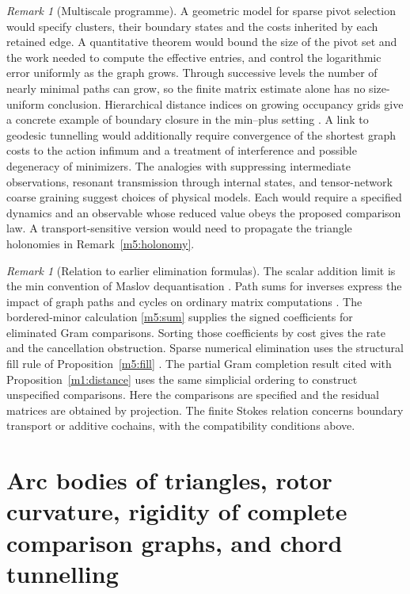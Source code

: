 \documentclass[11pt,reqno]{amsart}
\theoremstyle{definition}
\theoremstyle{remark}
\newtheorem{remark}[theorem]{Remark}
\numberwithin{equation}{section}
\begin{document}
\begin{remark}[Multiscale programme]\label{m5:programme}
A geometric model for sparse pivot selection would specify clusters, their
boundary states and the costs inherited by each retained edge. A
quantitative theorem would bound the size of the pivot set and the
work needed to compute the effective entries, and control the
logarithmic error uniformly as the graph grows. Through successive
levels the number of nearly minimal paths can grow, so the finite
matrix estimate alone has no size-uniform conclusion.
Hierarchical distance indices on growing occupancy grids give a
concrete example of boundary closure in the min--plus setting
\cite[\S V, Theorem~1]{m5:HTrip}. A link to
geodesic tunnelling would additionally require convergence of the
shortest graph costs to the action infimum and a treatment of
interference and possible degeneracy of minimizers. The analogies
with suppressing intermediate observations, resonant transmission
through internal states, and tensor-network coarse graining suggest
choices of physical models. Each would require a specified dynamics
and an observable whose reduced value obeys the proposed comparison
law. A transport-sensitive version would need to propagate the
triangle holonomies in Remark~\ref{m5:holonomy}.
\end{remark}

\begin{remark}[Relation to earlier elimination formulas]\label{m5:literature}
The scalar addition limit is the min convention of Maslov
dequantisation \cite[\S2]{m5:Litvinov}. Path sums for inverses
express the impact of graph paths and cycles on ordinary matrix
computations \cite[Thm.~3.2]{m5:Giscard}. The bordered-minor
calculation \eqref{m5:sum} supplies the signed coefficients for
eliminated Gram comparisons. Sorting those coefficients by cost
gives the rate and the cancellation obstruction. Sparse numerical
elimination uses the structural fill rule of
Proposition~\ref{m5:fill} \cite{m5:Rose}. The partial Gram completion
result cited with Proposition~\ref{m1:distance} uses the same
simplicial ordering to construct unspecified comparisons. Here
the comparisons are specified and the residual matrices are
obtained by projection. The finite Stokes relation concerns
boundary transport or additive cochains, with the compatibility
conditions above.
\end{remark}

\section{Arc bodies of triangles, rotor curvature, rigidity of complete comparison graphs, and chord tunnelling}\label{sec:m8}
\end{document}
